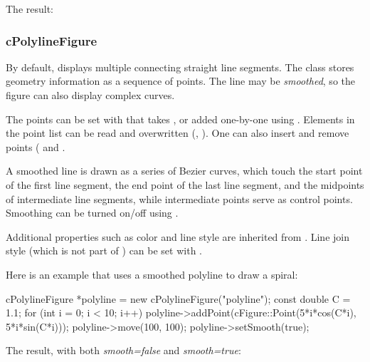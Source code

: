 
The result:

\begin{center}

\end{center}


\subsubsection{cPolylineFigure}
\label{sec:graphics:polylinefigure}

By default,  displays multiple connecting straight
line segments. The class stores geometry information as a sequence of
points. The line may be \textit{smoothed}, so the figure can also display
complex curves.

The points can be set with  that takes ,
or added one-by-one using . Elements in the point list can be
read and overwritten (, ). One can also
insert and remove points ( and .

A smoothed line is drawn as a series of Bezier curves, which touch the
start point of the first line segment, the end point of the last line
segment, and the midpoints of intermediate line segments, while
intermediate points serve as control points. Smoothing can be turned on/off
using .

Additional properties such as color and line style are inherited from
. Line join style (which is not part of
) can be set with .

Here is an example that uses a smoothed polyline to draw a spiral:

\begin{cpp}
cPolylineFigure *polyline = new cPolylineFigure("polyline");
const double C = 1.1;
for (int i = 0; i < 10; i++)
    polyline->addPoint(cFigure::Point(5*i*cos(C*i), 5*i*sin(C*i)));
polyline->move(100, 100);
polyline->setSmooth(true);
\end{cpp}


The result, with both \textit{smooth=false} and \textit{smooth=true}:

\begin{center}

\end{center}


